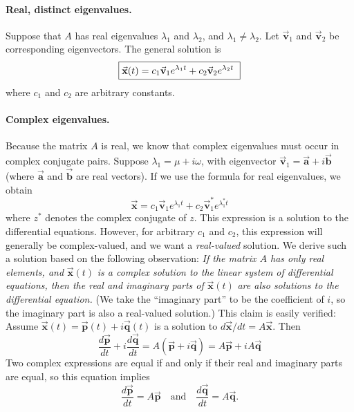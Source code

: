 \documentclass{book}
\newcommand{\BA}{\vec{\textbf{a}}}
\newcommand{\BB}{\vec{\textbf{b}}}
\newcommand{\BP}{\vec{\textbf{p}}}
\newcommand{\BQ}{\vec{\textbf{q}}}
\newcommand{\BV}{\vec{\textbf{v}}}
\newcommand{\BX}{\vec{\textbf{x}}}
\begin{document}
\paragraph{Real, distinct eigenvalues.}
Suppose that $A$ has real eigenvalues $\lambda_1$
and $\lambda_2$, and $\lambda_1 \ne \lambda_2$.
Let $\BV_1$ and $\BV_2$ be corresponding eigenvectors.
The general solution is
\begin{equation}
\textrm{\framebox{%
 $\BX(t) = c_1 \BV_1 e^{\lambda_1 t} + c_2 \BV_2 e^{\lambda_2 t}$
}}
\label{eqn:gensolreal}
\end{equation}
where $c_1$ and $c_2$ are arbitrary constants.

\paragraph{Complex eigenvalues.}
Because the matrix $A$ is real, we know that complex eigenvalues must
occur in complex conjugate pairs.
Suppose $\lambda_1 = \mu + i\omega$, with eigenvector
$\BV_1=\BA+i\BB$ (where $\BA$ and $\BB$ are real vectors).
If we use the formula for real eigenvalues,
we obtain
\begin{equation}
 \BX = c_1 \BV_1 e^{\lambda_1 t} + c_2 \BV_1^* e^{\lambda_1^* t} 
\end{equation}
where $z^*$ denotes the complex conjugate of $z$.
This expression is a solution to the differential equations.
However, for arbitrary $c_1$ and $c_2$, this expression will
generally be complex-valued, and we want a \emph{real-valued}
solution.
We derive such a solution based on the following observation:
\emph{If the matrix $A$ has only real elements, and} $\BX(t)$
\emph{is a complex solution to the linear system of differential equations,
then the real and imaginary parts of} $\BX(t)$
\emph{are also solutions
to the differential equation.}  (We take the ``imaginary part''
to be the coefficient of $i$, so the imaginary part is also
a real-valued solution.)  This claim is easily verified:
Assume $\BX(t) = \BP(t) + i \BQ(t)$ is a solution to
$d\BX/dt = A\BX$.  Then
\begin{equation}
  \frac{d\BP}{dt} + i\frac{d\BQ}{dt} = A(\BP+i\BQ) = A\BP + iA\BQ
\end{equation}
Two complex expressions are equal if and only if their real
and imaginary parts are equal, so this equation implies
\begin{equation}
  \frac{d\BP}{dt} = A\BP \quad \textrm{and} \quad
  \frac{d\BQ}{dt} = A\BQ.
\end{equation}
\end{document}
